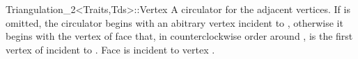 \begin{ccRefClass}{Triangulation_2<Traits,Tds>::Vertex}
{A circulator for the adjacent vertices.
If  is omitted, the circulator begins with
 an abitrary vertex incident
to , otherwise it begins with the
vertex of face  that, 
in counterclockwise order around ,
is the first vertex of  incident to .
\ccPrecond Face  is incident to vertex .}


\ccSeeAlso
{}




\end{ccRefClass}


